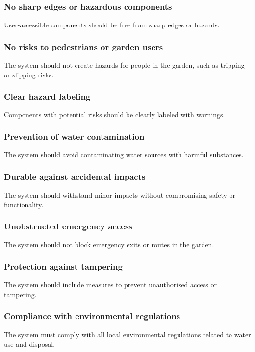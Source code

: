 \documentclass[11pt]{article}
\begin{document}
\subsubsection{No sharp edges or hazardous components}
User-accessible components should be free from sharp edges or hazards.

\subsubsection{No risks to pedestrians or garden users}
The system should not create hazards for people in the garden, such as tripping or slipping risks.

\subsubsection{Clear hazard labeling}
Components with potential risks should be clearly labeled with warnings.

\subsubsection{Prevention of water contamination}
The system should avoid contaminating water sources with harmful substances.

\subsubsection{Durable against accidental impacts}
The system should withstand minor impacts without compromising safety or functionality.

\subsubsection{Unobstructed emergency access}
The system should not block emergency exits or routes in the garden.

\subsubsection{Protection against tampering}
The system should include measures to prevent unauthorized access or tampering.

\subsubsection{Compliance with environmental regulations}
The system must comply with all local environmental regulations related to water use and disposal.
\end{document}
